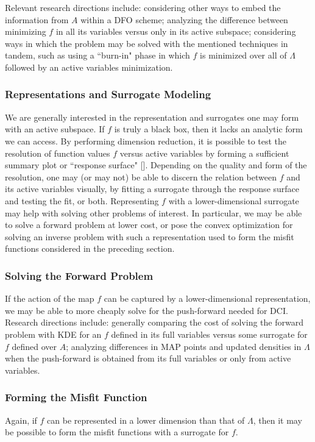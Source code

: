 \documentclass{amsart}
\begin{document}
Relevant research directions include: considering other ways to embed the information from $A$ within a DFO scheme; analyzing the difference between minimizing $f$ in all its variables versus only in its active subspace; considering ways in which the problem may be solved with the mentioned techniques in tandem, such as using a ``burn-in" phase in which $f$ is minimized over all of $\Lambda$ followed by an active variables minimization.


\subsubsection{Representations and Surrogate Modeling} We are generally interested in the representation and surrogates one may form with an active subspace. If $f$ is truly a black box, then it lacks an analytic form we can access. By performing dimension reduction, it is possible to test the resolution of function values $f$ versus active variables by forming a sufficient summary plot or ``response surface" []. Depending on the quality and form of the resolution, one may (or may not) be able to discern the relation between $f$ and its active variables visually, by fitting a surrogate through the response surface and testing the fit, or both. Representing $f$ with a lower-dimensional surrogate may help with solving other problems of interest. In particular, we may be able to solve a forward problem at lower cost, or pose the convex optimization for solving an inverse problem with such a representation used to form the misfit functions considered in the preceding section.


\subsubsection{Solving the Forward Problem} If the action of the map $f$ can be captured by a lower-dimensional representation, we may be able to more cheaply solve for the push-forward needed for DCI. Research directions include: generally comparing the cost of solving the forward problem with KDE for an $f$ defined in its full variables versus some surrogate for $f$ defined over $A$; analyzing differences in MAP points and updated densities in $\Lambda$ when the push-forward is obtained from its full variables or only from active variables.

\subsubsection{Forming the Misfit Function} Again, if $f$ can be represented in a lower dimension than that of $\Lambda$, then it may be possible to form the misfit functions with a surrogate for $f$.
\end{document}
